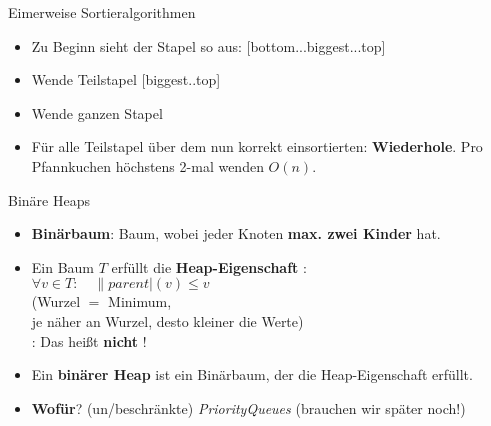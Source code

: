 \begin{frame}{Eimerweise Sortieralgorithmen}
	\solutionheading
	\begin{itemize}
		\item Zu Beginn sieht der Stapel so aus: [bottom...biggest...top]
		\item Wende Teilstapel [biggest..top] 
		\item Wende ganzen Stapel 
		\item Für alle Teilstapel über dem nun korrekt einsortierten: \textbf{Wiederhole}.
		\implitem Pro Pfannkuchen höchstens 2-mal wenden \impl $O(n)$.
	\end{itemize}
\end{frame}


\begin{frame}{Binäre Heaps}
	\begin{itemize}
		\item \textbf{Binärbaum}: Baum, wobei jeder Knoten \textbf{max. zwei Kinder} hat.
		\pause
		\item Ein Baum $T$ erfüllt die \textbf{Heap-Eigenschaft} :\gdw \\ 
		$\forall v \in T : \quad \|parent|(v) \leq v$ \\ \smallskip
		{\small (Wurzel $=$ Minimum, \\
			je näher an Wurzel, desto kleiner die Werte) } \\ \smallskip
		: Das heißt \textbf{nicht} !
		\pause
		\item Ein \textbf{binärer Heap} ist ein Binärbaum, der die Heap-Eigenschaft erfüllt.
		\pause
		\item \textbf{Wofür}? \impl (un/beschränkte) \textit{PriorityQueues}  {\small (brauchen wir später noch!)}
	\end{itemize}
\end{frame}

